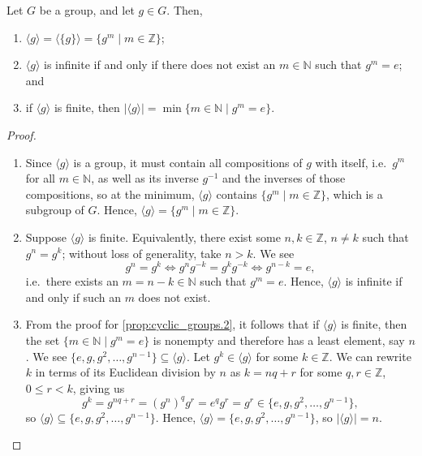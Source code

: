 \begin{prop}
Let $ G $ be a group, and let $ g\in G $. Then,
\begin{enumerate}
    \item $ \langle g\rangle=\langle\{g\}\rangle=\{g^m\mid m\in\mathbb{Z}\} $;
    \item $ \langle g\rangle $ is infinite if and only if there does not exist an $ m\in\mathbb{N} $ such that $ g^m=e $; and \label{prop:cyclic_groups.2}
    \item if $ \langle g\rangle $ is finite, then $ \lvert\langle g\rangle\rvert=\min\{m\in\mathbb{N}\mid g^m=e\} $.
\end{enumerate}
\end{prop}
\begin{proof}~
\begin{enumerate}

\item Since $ \langle g\rangle $ is a group, it must contain all compositions of $ g $ with itself, i.e.\ $ g^m $ for all $ m\in\mathbb{N} $, as well as its inverse $ g^{-1} $ and the inverses of those compositions, so at the minimum, $ \langle g\rangle $ contains $ \{g^m\mid m\in\mathbb{Z}\} $, which is a subgroup of $ G $. Hence, $ \langle g\rangle=\{g^m\mid m\in\mathbb{Z}\} $.

\item Suppose $ \langle g\rangle $ is finite. Equivalently, there exist some $ n,k\in\mathbb{Z} $, $ n\neq k $ such that $ g^n=g^k $; without loss of generality, take $ n>k $. We see
\begin{equation*}
    g^n=g^k \iff g^ng^{-k}=g^kg^{-k} \iff g^{n-k}=e,
\end{equation*}
i.e.\ there exists an $ m=n-k\in\mathbb{N} $ such that $ g^m=e $. Hence, $ \langle g\rangle $ is infinite if and only if such an $ m $ does not exist.

\item From the proof for \ref{prop:cyclic_groups.2}, it follows that if $ \langle g\rangle $ is finite, then the set $ \{m\in\mathbb{N}\mid g^m=e\} $ is nonempty and therefore has a least element, say $ n $. We see $ \{e,g,g^2,\ldots,g^{n-1}\}\subseteq\langle g\rangle $. Let $ g^k\in\langle g\rangle $ for some $ k\in\mathbb{Z} $. We can rewrite $ k $ in terms of its Euclidean division by $ n $ as $ k=nq+r $ for some $ q,r\in\mathbb{Z} $, $ 0\leq r<k$, giving us
\begin{equation*}
    g^k=g^{nq+r}=(g^n)^qg^r=e^qg^r=g^r\in\{e,g,g^2,\ldots,g^{n-1}\},
\end{equation*}
so $ \langle g\rangle\subseteq\{e,g,g^2,\ldots,g^{n-1}\} $. Hence, $ \langle g\rangle=\{e,g,g^2,\ldots,g^{n-1}\} $, so $ \lvert\langle g\rangle\rvert=n $.\qedhere
    
\end{enumerate}
\end{proof}

